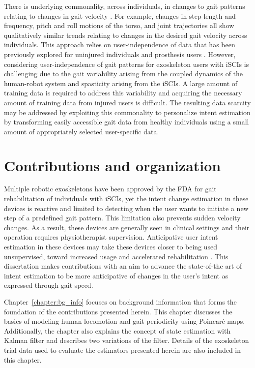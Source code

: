There is underlying commonality, across individuals, in changes to gait patterns relating to changes in gait velocity \cite{li1999coordination}. For example, changes in step length and frequency, pitch and roll motions of the torso, and joint trajectories all show qualitatively similar trends relating to changes in the desired gait velocity across individuals. This approach relies on user-independence of data that has been previously explored for uninjured individuals \cite{ibrahim2008gait, kilmartin2009optimising, wang2008accelerometry} and prosthesis users \cite{young2015classification}. However, considering user-independence of gait patterns for exoskeleton users with iSCIs is challenging due to the gait variability arising from the coupled dynamics of the human-robot system and spasticity arising from the iSCIs. A large amount of training data is required to address this variability and acquiring the necessary amount of training data from injured users is difficult. The resulting data scarcity may be addressed by exploiting this commonality to personalize intent estimation by transforming easily accessible gait data from healthy individuals using a small amount of appropriately selected user-specific data.

\section{Contributions and organization}

Multiple robotic exoskeletons have been approved by the FDA for gait rehabilitation of individuals with iSCIs, yet the intent change estimation in these devices is reactive and limited to detecting when the user wants to initiate a new step of a predefined gait pattern. This limitation also prevents sudden velocity changes. As a result, these devices are generally seen in clinical settings and their operation requires physiotherapist supervision. Anticipative user intent estimation in these devices may take these devices closer to being used unsupervised, toward increased usage and accelerated rehabilitation \cite{hidler2011role}. This dissertation makes contributions with an aim to advance the state-of-the art of intent estimation to be more anticipative of changes in the user's intent as expressed through gait speed.

Chapter~\ref{chapter:bg_info} focuses on background information that forms the foundation of the contributions presented herein. This chapter discusses the basics of modeling human locomotion and gait periodicity using Poincar\'e maps. Additionally, the chapter also explains the concept of state estimation with Kalman filter and describes two variations of the filter. Details of the exoskeleton trial data used to evaluate the estimators presented herein are also included in this chapter.

